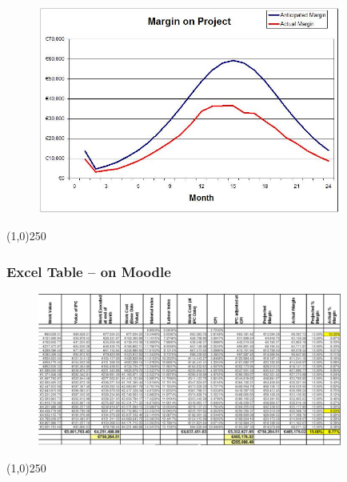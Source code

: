 \begin{frame}
\frametitle{}
\begin{figure}
	\centering
		\includegraphics[width = 10cm]{images/margin2.jpg}
	\label{fig:margin2}
\end{figure}

\end{frame}
\begin{center}\line(1,0){250}\end{center}






\begin{frame}
\frametitle{Excel Table – on Moodle}
\begin{figure}
	\centering
		\includegraphics[width = 10cm]{images/rawdata.jpg}
	\label{fig:rawdata}
\end{figure}
\end{frame}
\begin{center}\line(1,0){250}\end{center}






